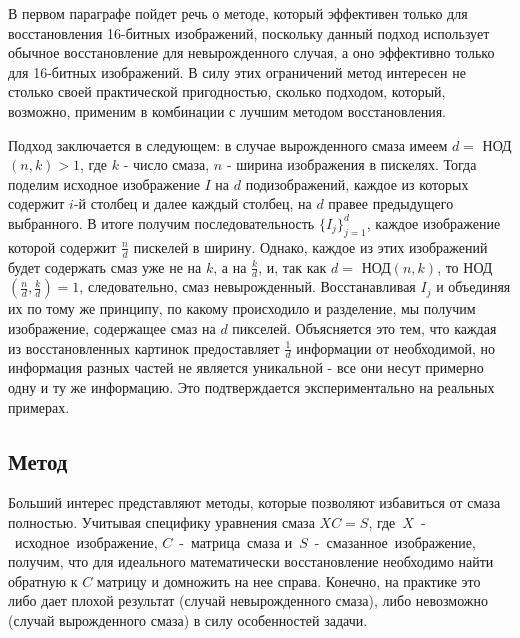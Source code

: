 \documentclass[a4paper]{article}
\theoremstyle{definition}
\begin{document}
    В первом параграфе пойдет речь о методе, который эффективен только для восстановления 16-битных изображений, поскольку данный подход использует обычное восстановление для невырожденного случая, а оно эффективно только для 16-битных изображений. В силу этих ограничений метод интересен не столько своей практической пригодностью, сколько подходом, который, возможно, применим в комбинации с лучшим методом восстановления.


    Подход заключается в следующем: в случае вырожденного смаза имеем $d =$ НОД$(n, k) > 1$, где $k$ - число смаза, $n$ - ширина изображения в пискелях. Тогда поделим исходное изображение $I$ на $d$ подизображений, каждое из которых содержит $i$-й столбец и далее каждый столбец, на $d$ правее предыдущего выбранного. В итоге получим последовательность $\{I_j\}_{j=1}^{d}$, каждое изображение которой содержит $\frac{n}{d}$ пискелей в ширину. Однако, каждое из этих изображений будет содержать смаз уже не на $k$, а на $\frac{k}{d}$, и, так как $d =$ НОД$(n, k)$, то НОД$(\frac{n}{d}, \frac{k}{d}) = 1$, следовательно, смаз невырожденный. Восстанавливая $I_j$ и объединяя их по тому же принципу, по какому происходило и разделение, мы получим изображение, содержащее смаз на $d$ пикселей. Объясняется это тем, что каждая из восстановленных картинок предоставляет $\frac{1}{d}$ информации от необходимой, но информация разных частей не является уникальной - все они несут примерно одну и ту же информацию. Это подтверждается экспериментально на реальных примерах.


    \newpage


    \begin{center}
        \section*{Метод }
    \end{center}


    Больший интерес представляют методы, которые позволяют избавиться от смаза полностью. Учитывая специфику уравнения смаза $XC = S$, где~$X$~-~исходное~изображение, $C$~-~матрица~смаза и~$S$~-~смазанное~изображение, получим, что для идеального математически восстановление необходимо найти обратную к $C$ матрицу и домножить на нее справа. Конечно, на практике это либо дает плохой результат (случай невырожденного смаза), либо невозможно (случай вырожденного смаза) в силу особенностей задачи.
\end{document}
